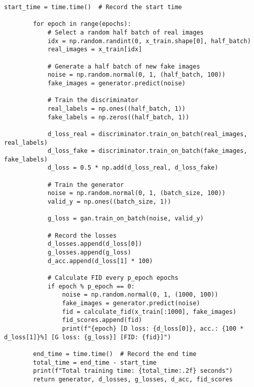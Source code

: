 \begin{lstlisting}[style=mypython, caption= {Explore GAN with 6 Convolutional Layers in Generator \\ and 3 Convolutional Layers in Discriminator}]
        start_time = time.time()  # Record the start time
    
        for epoch in range(epochs):
            # Select a random half batch of real images
            idx = np.random.randint(0, x_train.shape[0], half_batch)
            real_images = x_train[idx]
    
            # Generate a half batch of new fake images
            noise = np.random.normal(0, 1, (half_batch, 100))
            fake_images = generator.predict(noise)
    
            # Train the discriminator
            real_labels = np.ones((half_batch, 1))
            fake_labels = np.zeros((half_batch, 1))
    
            d_loss_real = discriminator.train_on_batch(real_images, real_labels)
            d_loss_fake = discriminator.train_on_batch(fake_images, fake_labels)
            d_loss = 0.5 * np.add(d_loss_real, d_loss_fake)
    
            # Train the generator
            noise = np.random.normal(0, 1, (batch_size, 100))
            valid_y = np.ones((batch_size, 1))
    
            g_loss = gan.train_on_batch(noise, valid_y)
    
            # Record the losses
            d_losses.append(d_loss[0])
            g_losses.append(g_loss)
            d_acc.append(d_loss[1] * 100)
            
            # Calculate FID every p_epoch epochs
            if epoch % p_epoch == 0:
                noise = np.random.normal(0, 1, (1000, 100))
                fake_images = generator.predict(noise)
                fid = calculate_fid(x_train[:1000], fake_images)
                fid_scores.append(fid)
                print(f"{epoch} [D loss: {d_loss[0]}, acc.: {100 * d_loss[1]}%] [G loss: {g_loss}] [FID: {fid}]")
    
        end_time = time.time()  # Record the end time
        total_time = end_time - start_time
        print(f"Total training time: {total_time:.2f} seconds")
        return generator, d_losses, g_losses, d_acc, fid_scores
    
\end{lstlisting}

